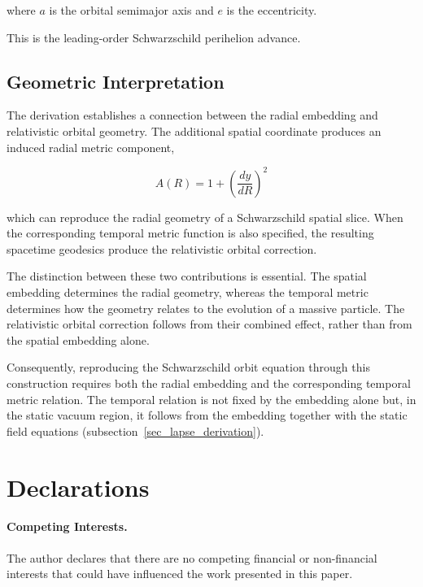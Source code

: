 \documentclass[pdflatex,sn-mathphys-num]{sn-jnl}%
\theoremstyle{thmstyleone}%
\theoremstyle{thmstyletwo}%
\theoremstyle{thmstylethree}%
\begin{document}
\begin{appendices}
where $a$ is the orbital semimajor axis and $e$ is the eccentricity.

This is the leading-order Schwarzschild perihelion advance.


\subsection{Geometric Interpretation}

The derivation establishes a connection between the radial embedding and relativistic orbital geometry. The additional spatial coordinate produces an induced radial metric component,

\begin{equation}
    A(R)
    =
    1+\left(\frac{dy}{dR}\right)^2
\end{equation}

which can reproduce the radial geometry of a Schwarzschild spatial slice. When the corresponding temporal metric function is also specified, the resulting spacetime geodesics produce the relativistic orbital correction.

The distinction between these two contributions is essential. The spatial embedding determines the radial geometry, whereas the temporal metric determines how the geometry relates to the evolution of a massive particle. The relativistic orbital correction follows from their combined effect, rather than from the spatial embedding alone.

Consequently, reproducing the Schwarzschild orbit equation through this construction requires both the radial embedding and the corresponding temporal metric relation. The temporal relation is not fixed by the embedding alone but, in the static vacuum region, it follows from the embedding together with the static field equations (subsection~\ref{sec_lapse_derivation}).


\end{appendices}

\section*{Declarations}

\paragraph{Competing Interests.}
The author declares that there are no competing financial or non-financial interests that could have influenced the work presented in this paper.
\end{document}
